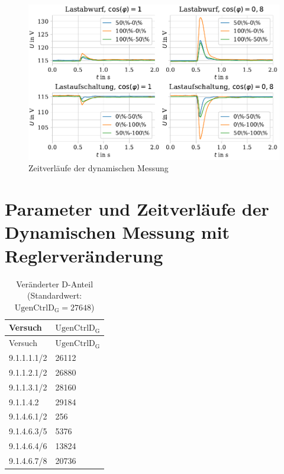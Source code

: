 \begin{figure}[H]
	\centering
	\includegraphics{Bilder/DynamischeMessung.pdf}
	\caption{Zeitverläufe der dynamischen Messung}
	\label{fig:ZeitverlaufDynamischOhneRegleraenderung}
\end{figure}

\section{Parameter und Zeitverläufe der Dynamischen Messung mit Reglerveränderung}
\label{sec:ReglerparameterDynamischeMessung}

\begin{longtable}[]{ll}
    \caption{Veränderter D-Anteil (Standardwert: $\mathrm{UgenCtrlD_G}=27648$)}
    \label{tab:Parameter-D-Messung}
    \tabularnewline
    \toprule
    Versuch     & $\mathrm{UgenCtrlD_G}$ \\
    \midrule
    \endfirsthead
    \toprule
    Versuch     & $\mathrm{UgenCtrlD_G}$ \\
    \midrule
    \endhead    
    9.1.1.1.1/2 & 26112        \\
    9.1.1.2.1/2 & 26880        \\
    9.1.1.3.1/2 & 28160        \\
    9.1.1.4.2 & 29184        \\
    9.1.4.6.1/2 & 256          \\
    9.1.4.6.3/5 & 5376         \\
    9.1.4.6.4/6 & 13824        \\
    9.1.4.6.7/8 & 20736        \\
    \bottomrule
\end{longtable}

